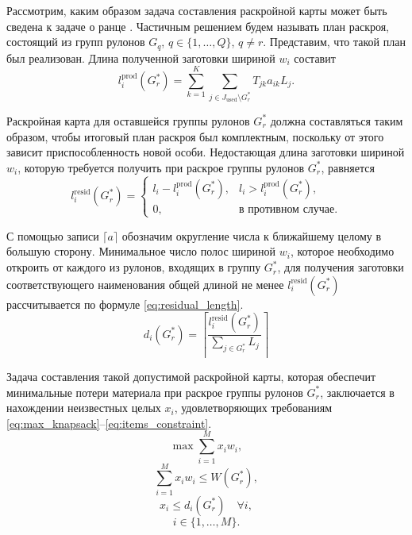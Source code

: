 \documentclass[12pt]{article}
\begin{document}
Рассмотрим, каким образом задача составления раскройной карты может быть 
сведена к задаче о ранце 
\cite{bib:martello90}. 
Частичным решением будем называть план 
раскроя, состоящий из групп рулонов $G_q$, $q \in \{1,\ldots,Q\}$, $q \neq r$. 
Представим, что такой план был реализован. Длина полученной заготовки шириной 
$w_i$ составит
\[ l_{i}^{\text{prod}}(G_r^*)=\sum_{k=1}^{K} \sum_{j \in J_{\text{used}} \setminus G_r^*} T_{jk} a_{ik} L_j. \]

Раскройная карта для оставшейся группы рулонов $G_r^*$ должна составляться 
таким образом, чтобы итоговый план раскроя был комплектным, поскольку от этого 
зависит приспособленность новой особи. Недостающая длина заготовки шириной 
$w_i$, которую требуется получить при раскрое группы рулонов $G_r^*$, равняется
\[ l_{i}^{\text{resid}}(G_r^*)=
    \begin{cases}
        l_i-l_{i}^{\text{prod}}(G_r^*), & l_i > l_{i}^{\text{prod}}(G_r^*), \\
        0, & \text{в противном случае}.
    \end{cases} \]

С помощью записи $\lceil a \rceil$ обозначим округление числа к ближайшему 
целому в большую сторону. Минимальное число полос шириной $w_i$, которое 
необходимо откроить от каждого из рулонов, входящих в группу $G_r^*$, для 
получения заготовки соответствующего наименования общей длиной не менее 
$l_{i}^{\text{resid}}(G_r^*)$ рассчитывается по формуле 
\eqref{eq:residual_length}.
\begin{equation}\label{eq:residual_length}
d_i(G_r^*)=\left\lceil \frac{l_{i}^{\text{resid}}(G_r^*)}
                            {\sum_{j \in G_r^*} L_j} \right\rceil    
\end{equation}
    
Задача составления такой допустимой раскройной карты, которая обеспечит 
минимальные потери материала при раскрое группы рулонов $G_r^*$, заключается 
в нахождении неизвестных целых $x_i$, удовлетворяющих требованиям 
\eqref{eq:max_knapsack}--\eqref{eq:items_constraint}.    
\begin{equation}\label{eq:max_knapsack}
    \max{\sum_{i=1}^{M} x_i w_i},
\end{equation}        
\begin{equation}\label{eq:knapsack_constraint}
    \sum_{i=1}^{M} x_i w_i \leq W(G_r^*),
\end{equation}        
\begin{equation}\label{eq:items_constraint}
    x_i \leq d_i(G_r^*) \quad \forall i,
\end{equation}        
\[ i \in \{1,\ldots,M\}. \]
\end{document}
